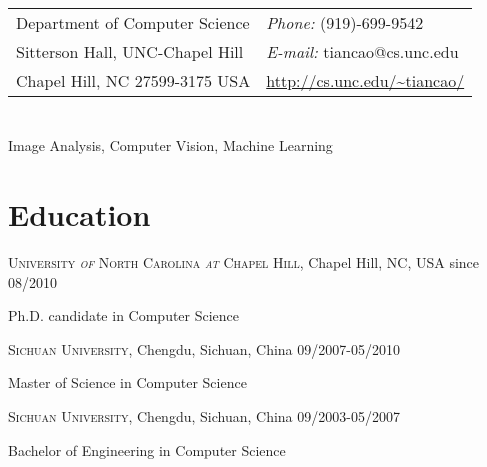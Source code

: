 \documentclass[line,margin]{res}
\newenvironment{list1}{
  \begin{list}{\ding{113}}{%
      \setlength{\itemsep}{0in}
      \setlength{\parsep}{0in} \setlength{\parskip}{0in}
      \setlength{\topsep}{0in} \setlength{\partopsep}{0in} 
      \setlength{\leftmargin}{0.17in}}}{\end{list}}
\begin{document}

\begin{resume}
\section{}
\vspace{.05in}
\begin{tabular}{@{}p{3in}p{3in}}
Department of Computer Science & {\it Phone:}  (919)-699-9542 \\            
Sitterson Hall, UNC-Chapel Hill & {\it E-mail:}  tiancao@cs.unc.edu \\
Chapel Hill, NC 27599-3175 USA&  \url{http://cs.unc.edu/~tiancao/} \\
\end{tabular}
 
\section{}       
\smallskip

Image Analysis, Computer Vision, Machine Learning

\section{\sc Education}
\smallskip

\textsc{University \textit{of} North Carolina \textit{at} Chapel Hill}, Chapel Hill, NC, USA \hfill{since 08/2010}\\
\vspace*{-.1in}
\begin{list1}
\item[] Ph.D. candidate in Computer Science %
\end{list1}
 \vspace*{-.1in}
\textsc{Sichuan University}, Chengdu, Sichuan, China \hfill {09/2007-05/2010}\\
\vspace*{-.1in}
\begin{list1}
\item[] Master of Science in Computer Science  %
\end{list1}
 \vspace*{-.1in}
\textsc{Sichuan University}, Chengdu, Sichuan, China \hfill{09/2003-05/2007}\\
 \vspace*{-.1in}
\begin{list1}
 \item[]  Bachelor of Engineering in Computer Science %
\end{list1}


\end{resume}
\end{document}
